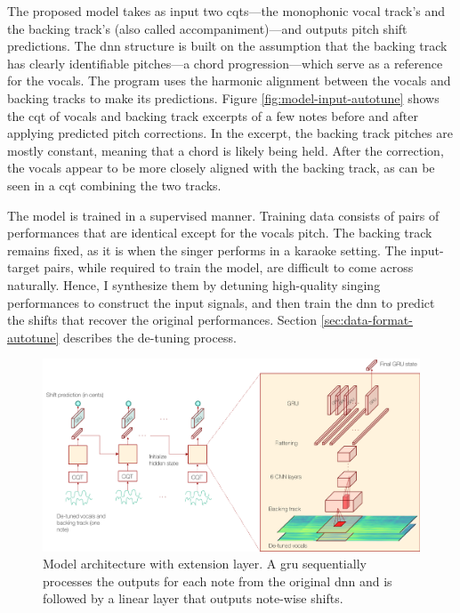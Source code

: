 The proposed model takes as input two \gls{cqt}s---the monophonic vocal track's and the backing track's (also called accompaniment)---and outputs pitch shift predictions. The \gls{dnn} structure is built on the assumption that the backing track has clearly identifiable pitches---a chord progression---which serve as a reference for the vocals. The program uses the harmonic alignment between the vocals and backing tracks to make its predictions. Figure \ref{fig:model-input-autotune} shows the \gls{cqt} of vocals and backing track excerpts of a few notes before and after applying predicted pitch corrections. In the excerpt, the backing track pitches are mostly constant, meaning that a chord is likely being held. After the correction, the vocals appear to be more closely aligned with the backing track, as can be seen in a \gls{cqt} combining the two tracks.

The model is trained in a supervised manner. Training data consists of pairs of performances that are identical except for the vocals pitch. The backing track remains fixed, as it is when the singer performs in a karaoke setting. The input-target pairs, while required to train the model, are difficult to come across naturally. Hence, I synthesize them by detuning high-quality singing performances to construct the input signals, and then train the \gls{dnn} to predict the shifts that recover the original performances. Section \ref{sec:data-format-autotune} describes the de-tuning process.
\begin{figure}[t!]
    \centering
    \includegraphics[width=\columnwidth]{images/model_outline_extension_1.png}
    \caption{Model architecture with extension layer. A \gls{gru} sequentially processes the outputs for each note from the original \gls{dnn} and is followed by a linear layer that outputs note-wise shifts.}
    \label{fig:model_outline_extended}
\end{figure}

